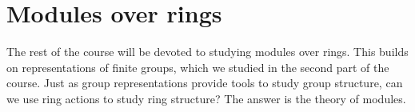 \documentclass[12pt,oneside]{amsproc}
\begin{document}



\part{Modules over rings}

The rest of the course will be devoted to studying modules over rings. This
builds on representations of finite groups, which we studied in the second part
of the course.  Just as group representations provide tools to study group
structure, can we use ring actions to study ring structure? The answer is the
theory of modules.







\newpage 



\printindex
\end{document}
